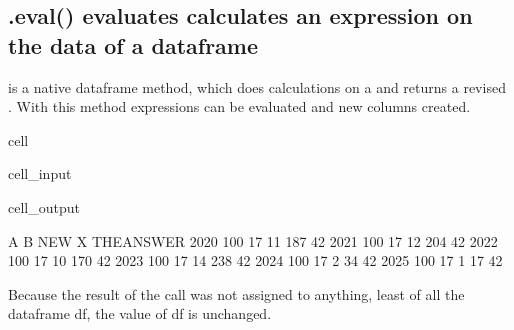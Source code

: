 \documentclass[letterpaper,10pt,english]{jupyterBook}
\begin{document}
\subsection{.eval() evaluates calculates an expression on the data of a dataframe}
\label{\detokenize{content/04_PythonEssentials/PythonPandasDataframes:eval-evaluates-calculates-an-expression-on-the-data-of-a-dataframe}}
\sphinxAtStartPar
{} is a native dataframe method, which does calculations on a  and returns a revised . With this method expressions can be evaluated and new columns created.

\begin{sphinxuseclass}{cell}\begin{sphinxVerbatimInput}

\begin{sphinxuseclass}{cell_input}
\begin{sphinxVerbatim}[commandchars=\\\{\}]
\end{sphinxVerbatim}

\end{sphinxuseclass}\end{sphinxVerbatimInput}
\begin{sphinxVerbatimOutput}

\begin{sphinxuseclass}{cell_output}
\begin{sphinxVerbatim}[commandchars=\\\{\}]
        A   B  NEW    X  THE\PYGZus{}ANSWER
2020  100  17   11  187          42
2021  100  17   12  204          42
2022  100  17   10  170          42
2023  100  17   14  238          42
2024  100  17    2   34          42
2025  100  17    1   17          42
\end{sphinxVerbatim}

\end{sphinxuseclass}\end{sphinxVerbatimOutput}

\end{sphinxuseclass}
\sphinxAtStartPar
Because the result of the  call was not assigned to anything, least of all the dataframe df, the value of df is unchanged.
\end{document}
